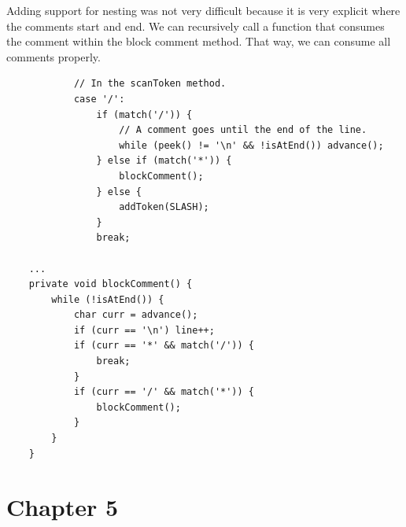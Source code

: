 \documentclass{article}
\begin{document}
\begin{enumerate}
{        Adding support for nesting was not very difficult because it is 
        very explicit where the comments start and end. We can recursively 
        call a function that consumes the comment within the block comment method.
        That way, we can consume all comments properly.

        \begin{lstlisting}
            // In the scanToken method.
            case '/': 
                if (match('/')) {
                    // A comment goes until the end of the line.
                    while (peek() != '\n' && !isAtEnd()) advance();
                } else if (match('*')) {
                    blockComment();
                } else {
                    addToken(SLASH);
                }
                break;

    ...
    private void blockComment() {
        while (!isAtEnd()) {
            char curr = advance();
            if (curr == '\n') line++;
            if (curr == '*' && match('/')) {
                break;
            }
            if (curr == '/' && match('*')) {
                blockComment();
            }
        }
    }

        \end{lstlisting}
    }
\end{enumerate}

\section*{Chapter 5}
\end{document}
